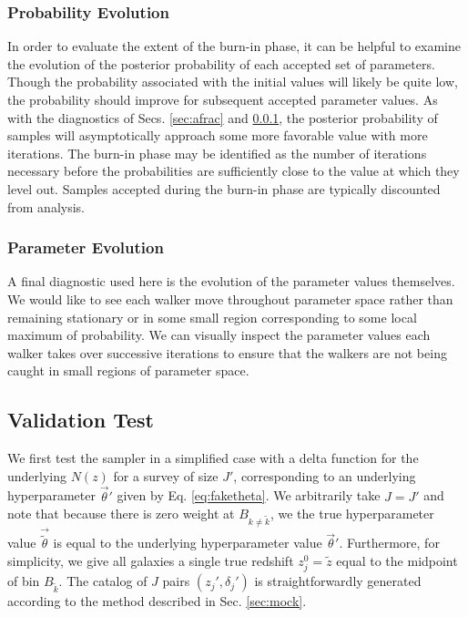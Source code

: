 \documentclass[preprint]{aastex}
\begin{document}
\subsubsection{Probability Evolution}
\label{sec:probs}

In order to evaluate the extent of the burn-in phase, it can be helpful to examine the evolution of the posterior probability of each accepted set of parameters.  Though the probability associated with the initial values will likely be quite low, the probability should improve for subsequent accepted parameter values.  As with the diagnostics of Secs. \ref{sec:afrac} and \ref{sec:probs}, the posterior probability of samples will asymptotically approach some more favorable value with more iterations.  The burn-in phase may be identified as the number of iterations necessary before the probabilities are sufficiently close to the value at which they level out.  Samples accepted during the burn-in phase are typically discounted from analysis.

\subsubsection{Parameter Evolution}
\label{sec:params}

A final diagnostic used here is the evolution of the parameter values themselves.  We would like to see each walker move throughout parameter space rather than remaining stationary or in some small region corresponding to some local maximum of probability.  We can visually inspect the parameter values each walker takes over successive iterations to ensure that the walkers are not being caught in small regions of parameter space.

\subsection{Validation Test}
\label{sec:fake}

We first test the sampler in a simplified case with a delta function for the underlying $N(z)$ for a survey of size $J'$, corresponding to an underlying hyperparameter $\vec{\theta}'$ given by Eq. \ref{eq:faketheta}.  We arbitrarily take $J=J'$ and note that because there is zero weight at $B_{k\neq\tilde{k}}$, we the true hyperparameter value $\vec{\tilde{\theta}}$ is equal to the underlying hyperparameter value $\vec{\theta}'$.  Furthermore, for simplicity, we give all galaxies a single true redshift $z_{j}^{0}=\tilde{z}$ equal to the midpoint of bin $B_{\tilde{k}}$.  The catalog of $J$ pairs $(z_{j}',\delta_{j}')$ is straightforwardly generated according to the method described in Sec. \ref{sec:mock}.
\end{document}

